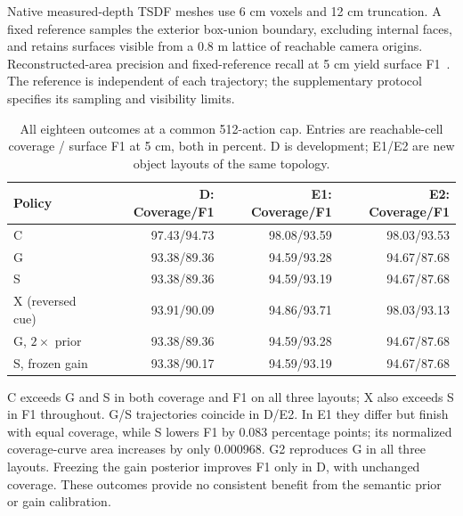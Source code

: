 Native measured-depth TSDF meshes use 6 cm voxels and 12 cm truncation. A fixed reference samples the exterior box-union boundary, excluding internal faces, and retains surfaces visible from a 0.8 m lattice of reachable camera origins. Reconstructed-area precision and fixed-reference recall at 5 cm yield surface F1~\cite{ref14}. The reference is independent of each trajectory; the supplementary protocol specifies its sampling and visibility limits.

\begin{table}[!htbp]\centering\small

\caption{All eighteen outcomes at a common 512-action cap. Entries are reachable-cell coverage / surface F1 at 5 cm, both in percent. D is development; E1/E2 are new object layouts of the same topology.}\label{tab:four-room-matrix}

\begin{tabular}{@{}lrrr@{}}\toprule Policy & D: Coverage/F1 & E1: Coverage/F1 & E2: Coverage/F1 \\ \midrule

C & 97.43/94.73 & 98.08/93.59 & 98.03/93.53 \\

G & 93.38/89.36 & 94.59/93.28 & 94.67/87.68 \\

S & 93.38/89.36 & 94.59/93.19 & 94.67/87.68 \\

X (reversed cue) & 93.91/90.09 & 94.86/93.71 & 98.03/93.13 \\

G, $2\times$ prior & 93.38/89.36 & 94.59/93.28 & 94.67/87.68 \\

S, frozen gain & 93.38/90.17 & 94.59/93.19 & 94.67/87.68 \\

\bottomrule\end{tabular}\end{table}

C exceeds G and S in both coverage and F1 on all three layouts; X also exceeds S in F1 throughout. G/S trajectories coincide in D/E2. In E1 they differ but finish with equal coverage, while S lowers F1 by 0.083 percentage points; its normalized coverage-curve area increases by only 0.000968. G2 reproduces G in all three layouts. Freezing the gain posterior improves F1 only in D, with unchanged coverage. These outcomes provide no consistent benefit from the semantic prior or gain calibration.

